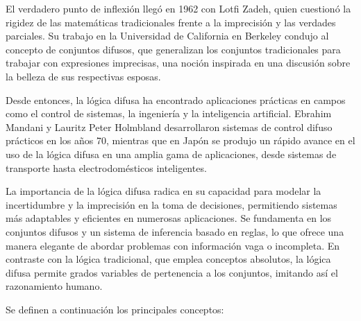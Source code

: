 \documentclass[
  a4paper,
  DIV=11,
  numbers=noendperiod]{scrreprt}
\begin{document}
El verdadero punto de inflexión llegó en 1962 con Lotfi Zadeh, quien
cuestionó la rigidez de las matemáticas tradicionales frente a la
imprecisión y las verdades parciales. Su trabajo en la Universidad de
California en Berkeley condujo al concepto de conjuntos difusos, que
generalizan los conjuntos tradicionales para trabajar con expresiones
imprecisas, una noción inspirada en una discusión sobre la belleza de
sus respectivas esposas.

Desde entonces, la lógica difusa ha encontrado aplicaciones prácticas en
campos como el control de sistemas, la ingeniería y la inteligencia
artificial. Ebrahim Mandani y Lauritz Peter Holmbland desarrollaron
sistemas de control difuso prácticos en los años 70, mientras que en
Japón se produjo un rápido avance en el uso de la lógica difusa en una
amplia gama de aplicaciones, desde sistemas de transporte hasta
electrodomésticos inteligentes.

La importancia de la lógica difusa radica en su capacidad para modelar
la incertidumbre y la imprecisión en la toma de decisiones, permitiendo
sistemas más adaptables y eficientes en numerosas aplicaciones. Se
fundamenta en los conjuntos difusos y un sistema de inferencia basado en
reglas, lo que ofrece una manera elegante de abordar problemas con
información vaga o incompleta. En contraste con la lógica tradicional,
que emplea conceptos absolutos, la lógica difusa permite grados
variables de pertenencia a los conjuntos, imitando así el razonamiento
humano.

Se definen a continuación los principales conceptos:
\end{document}
